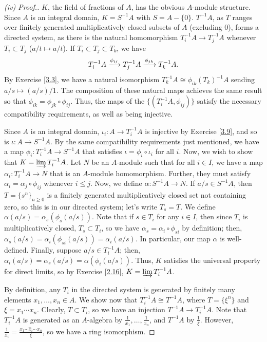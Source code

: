 \begin{proof}[(iv) Proof.]
$K$, the field of fractions of $A$, has the obvious $A$-module structure. Since $A$ is an integral domain, $K = S^{-1}A$ with $S = A - \{0\}$. $T^{-1}A$, as $T$ ranges over finitely generated
multiplicatively closed subsets of $A$ (excluding $0$), forms a directed system, as there is the natural homomorphism $T_i^{-1}A \to T_j^{-1}A$ whenever $T_i \subset T_j$ ($a/t \mapsto a/t$). 
If $T_i \subset T_j \subset T_k$, we have
$$T_i^{-1}A \xlongrightarrow{\phi_{ij}} T_j^{-1}A \xlongrightarrow{\phi_{jk}} T_k^{-1}A.$$
By Exercise \ref{3.3}, we have a natural isomorphism $T_k^{-1}A \cong \phi_{ik}(T_k)^{-1}A$ sending $a/s \mapsto (a/s)/1$. The composition of these natural maps achieves the same result so that
$\phi_{ik} = \phi_{jk}\circ\phi_{ij}$. Thus, the maps of the $\{(T_i^{-1}A,\phi_{ij})\}$ satisfy the necessary compatibility requirements, as well as being injective.

Since $A$ is an integral domain, $\iota_i : A \to T_i^{-1}A$ is injective by Exercise \ref{3.9}, and so is $\iota : A \to S^{-1}A$. By the same compatibility requirements just mentioned, we have
a map $\phi_i : T_i^{-1}A \to S^{-1}A$ that satisfies $\iota = \phi_i \circ \iota_i$ for all $i$. Now, we wish to show that $K = \varinjlim T_i^{-1}A$. Let $N$ be an $A$-module such that for all $i \in I$,
we have a map $\alpha_i : T_i^{-1}A \to N$ that is an $A$-module homomorphism. Further, they must satisfy $\alpha_i = \alpha_j \circ \phi_{ij}$ whenever $i \le j$. Now, we define $\alpha : S^{-1}A \to N$.
If $a/s \in S^{-1}A$, then $T = \{s^n\}_{n \ge 0}$ is a finitely generated multiplicatively closed set not containing zero, so this is in our directed system; let's write $T_s = T$. We define 
$\alpha(a/s) = \alpha_s(\phi_s(a/s))$. Note that if $s \in T_i$ for any $i \in I$, then since $T_i$ is multiplicatively closed, $T_s \subset T_i$, so we have $\alpha_s = \alpha_i \circ \phi_{si}$ 
by definition; then, $\alpha_s(a/s) = \alpha_i(\phi_{si}(a/s)) = \alpha_i(a/s)$. In particular, our map $\alpha$ is well-defined. Finally, suppose $a/s \in T_i^{-1}A$; then, $\alpha_i(a/s) = \alpha_s(a/s)
= \alpha(\phi_i(a/s))$. Thus, $K$ satisfies the universal property for direct limits, so by Exercise \ref{2.16}, $K = \varinjlim T_i^{-1}A$.

By definition, any $T_i$ in the directed system is generated by finitely many elements $x_1,\ldots,x_n \in A$. We show now that $T_i^{-1}A \cong T^{-1}A$, where $T = \{\xi^n\}$ and $\xi = x_1\cdots x_n$.
Clearly, $T \subset T_i$, so we have an injection $T^{-1}A \to T_i^{-1}A$. Note that $T_i^{-1}A$ is generated as an $A$-algebra by $\frac{1}{x_1},\ldots,\frac{1}{x_n}$, and $T^{-1}A$ by $\frac{1}{\xi}$.
However, $\frac{1}{x_i} = \frac{x_1 \cdots \hat x_i \cdots x_n}{\xi}$, so we have a ring isomorphism.


\end{proof}
